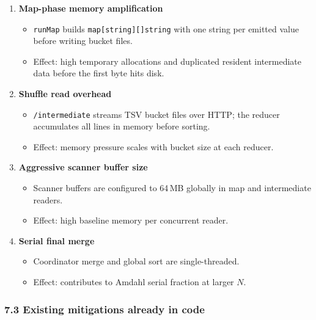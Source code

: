 \documentclass[
]{article}
\providecommand{\tightlist}{%
  \setlength{\itemsep}{0pt}\setlength{\parskip}{0pt}}
\begin{document}
\begin{enumerate}
\def\labelenumi{\arabic{enumi}.}
\tightlist
\item
  \textbf{Map-phase memory amplification}

  \begin{itemize}
  \tightlist
  \item
    \texttt{runMap} builds \texttt{map{[}string{]}{[}{]}string} with one
    string per emitted value before writing bucket files.
  \item
    Effect: high temporary allocations and duplicated resident
    intermediate data before the first byte hits disk.
  \end{itemize}
\item
  \textbf{Shuffle read overhead}

  \begin{itemize}
  \tightlist
  \item
    \texttt{/intermediate} streams TSV bucket files over HTTP; the
    reducer accumulates all lines in memory before sorting.
  \item
    Effect: memory pressure scales with bucket size at each reducer.
  \end{itemize}
\item
  \textbf{Aggressive scanner buffer size}

  \begin{itemize}
  \tightlist
  \item
    Scanner buffers are configured to 64\,MB globally in map and
    intermediate readers.
  \item
    Effect: high baseline memory per concurrent reader.
  \end{itemize}
\item
  \textbf{Serial final merge}

  \begin{itemize}
  \tightlist
  \item
    Coordinator merge and global sort are single-threaded.
  \item
    Effect: contributes to Amdahl serial fraction at larger \(N\).
  \end{itemize}
\end{enumerate}

\subsubsection{7.3 Existing mitigations already in
code}\label{existing-mitigations-already-in-code}
\end{document}
